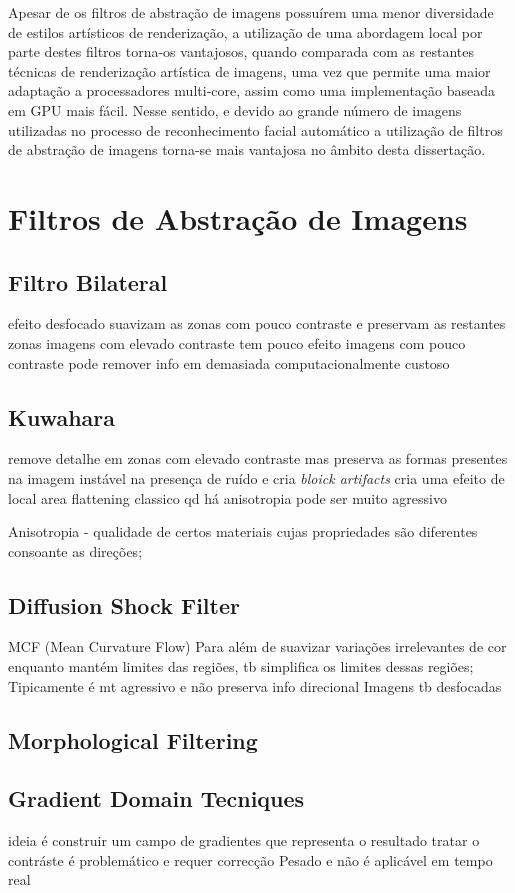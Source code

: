 Apesar de os filtros de abstração de imagens possuírem uma menor diversidade de estilos artísticos de renderização,  a utilização de uma abordagem local por parte destes filtros torna-os vantajosos, quando comparada com as restantes técnicas de renderização artística de imagens, uma vez que permite uma maior adaptação a processadores multi-core, assim como uma implementação baseada em GPU mais fácil. Nesse sentido, e devido ao grande número de imagens utilizadas no processo de reconhecimento facial automático a utilização de filtros de abstração de imagens torna-se mais vantajosa no âmbito desta dissertação.

\section{Filtros de Abstração de Imagens}

\subsection{Filtro Bilateral}
efeito desfocado
suavizam as zonas com pouco contraste e preservam as restantes zonas
imagens com elevado contraste tem pouco efeito
imagens com pouco contraste pode remover info em demasiada
computacionalmente custoso

\subsection{Kuwahara}
remove detalhe em zonas com elevado contraste mas preserva as formas presentes na imagem
instável na presença de ruído e cria \textit{bloick artifacts}
cria uma efeito de local area flattening
classico qd há anisotropia pode ser muito agressivo

Anisotropia - qualidade de certos materiais cujas propriedades são diferentes consoante as direções;

\subsection{Diffusion Shock Filter}
MCF (Mean Curvature Flow)
Para além de suavizar variações irrelevantes de cor enquanto mantém limites das regiões, tb simplifica os limites dessas regiões;
Tipicamente é mt agressivo e não preserva info direcional
Imagens tb desfocadas

\subsection{Morphological Filtering}

\subsection{Gradient Domain Tecniques}
ideia é construir um campo de gradientes que representa o resultado tratar o contráste é problemático e requer correcção
Pesado e não é aplicável em tempo real